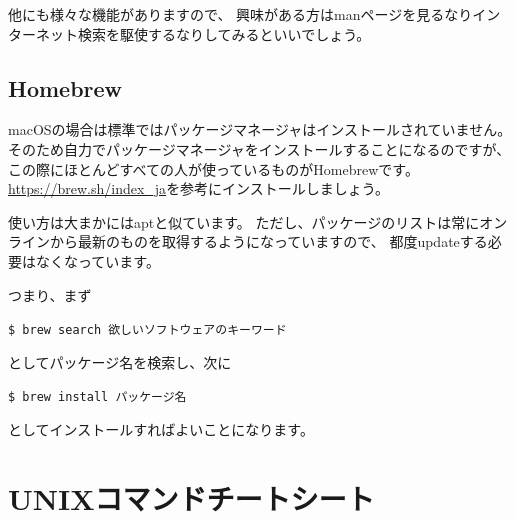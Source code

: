 \documentclass[a4j]{ltjsreport}
\begin{document}
    他にも様々な機能がありますので、
    興味がある方はmanページを見るなりインターネット検索を駆使するなりしてみるといいでしょう。

    \subsection{Homebrew}
    macOSの場合は標準ではパッケージマネージャはインストールされていません。
    そのため自力でパッケージマネージャをインストールすることになるのですが、
    この際にほとんどすべての人が使っているものがHomebrewです。
    \url{https://brew.sh/index_ja}を参考にインストールしましょう。

    使い方は大まかにはaptと似ています。
    ただし、パッケージのリストは常にオンラインから最新のものを取得するようになっていますので、
    都度updateする必要はなくなっています。

    つまり、まず
    \begin{screen}
        \texttt{\$ brew search 欲しいソフトウェアのキーワード}
    \end{screen}
    としてパッケージ名を検索し、次に
    \begin{screen}
        \texttt{\$ brew install パッケージ名}
    \end{screen}
    としてインストールすればよいことになります。



    \section{UNIXコマンドチートシート}
\end{document}
